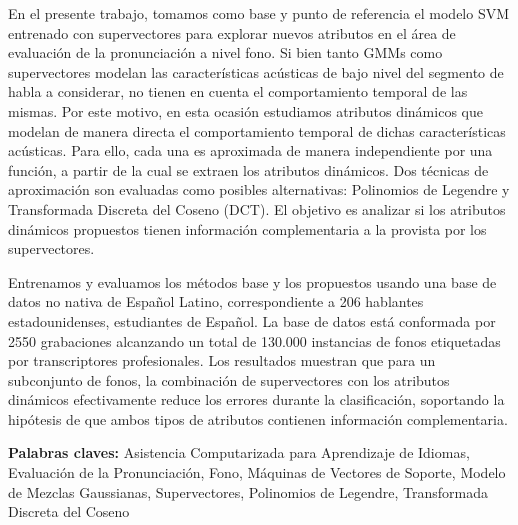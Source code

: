 En el presente trabajo, tomamos como
base y punto de referencia el modelo SVM entrenado con
supervectores para explorar nuevos atributos en el área de evaluación de la
pronunciación a nivel fono.
Si bien tanto GMMs como
supervectores modelan las características acústicas de
bajo nivel del segmento
de habla a considerar,
no tienen en cuenta el comportamiento temporal de las mismas.
Por este motivo, en esta ocasión
estudiamos atributos dinámicos
que modelan de manera directa el comportamiento temporal de dichas
características acústicas.
Para ello, cada una es aproximada
de manera independiente por una función,
a partir de la cual se extraen los atributos dinámicos.
Dos técnicas de aproximación son evaluadas como posibles alternativas:
Polinomios de Legendre y Transformada Discreta del Coseno (DCT).
El objetivo
es analizar si
los atributos dinámicos propuestos tienen información
complementaria a la provista por los supervectores.

Entrenamos y evaluamos los métodos base y los propuestos usando una base de datos no nativa
de Español Latino, correspondiente a 206 hablantes estadounidenses, estudiantes de Español.
La base de datos está conformada por 2550 grabaciones alcanzando
un total de 130.000 instancias de fonos etiquetadas
por transcriptores profesionales.
Los resultados muestran que para un subconjunto de fonos, la combinación de supervectores
con los atributos dinámicos efectivamente reduce los errores durante la clasificación,
soportando la
hipótesis de que ambos tipos de atributos contienen información complementaria.

\bigskip

\noindent\textbf{Palabras claves:} Asistencia Computarizada para Aprendizaje de Idiomas, Evaluación de la Pronunciación, Fono, Máquinas de Vectores de Soporte, Modelo de Mezclas Gaussianas, Supervectores, Polinomios de Legendre, Transformada Discreta del Coseno

